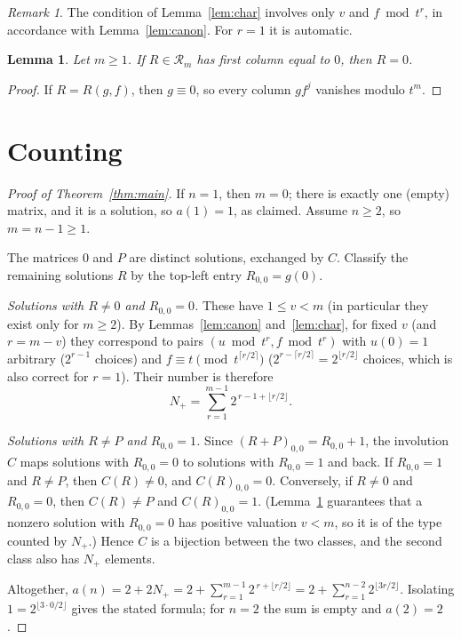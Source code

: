 \documentclass[11pt,a4paper]{amsart}
\newtheorem{lemma}[theorem]{Lemma}
\theoremstyle{definition}
\theoremstyle{remark}
\newtheorem{remark}[theorem]{Remark}
\newcommand{\Rm}{\mathcal{R}_m}
\begin{document}
\begin{remark}
The condition of Lemma~\ref{lem:char} involves only $v$ and $f\bmod t^{r}$, in accordance with Lemma~\ref{lem:canon}. For $r=1$ it is automatic.
\end{remark}

\begin{lemma}\label{lem:zero}
Let $m\ge1$. If $R\in\Rm$ has first column equal to $0$, then $R=0$.
\end{lemma}

\begin{proof}
If $R=R(g,f)$, then $g\equiv0$, so every column $gf^j$ vanishes modulo $t^m$.
\end{proof}

\section{Counting}\label{sec:count}

\begin{proof}[Proof of Theorem~\ref{thm:main}]
If $n=1$, then $m=0$; there is exactly one (empty) matrix, and it is a solution, so $a(1)=1$, as claimed. Assume $n\ge2$, so $m=n-1\ge1$.

The matrices $0$ and $P$ are distinct solutions, exchanged by $C$. Classify the remaining solutions $R$ by the top-left entry $R_{0,0}=g(0)$.

\emph{Solutions with $R\ne0$ and $R_{0,0}=0$.} These have $1\le v<m$ (in particular they exist only for $m\ge2$). By Lemmas~\ref{lem:canon} and~\ref{lem:char}, for fixed $v$ (and $r=m-v$) they correspond to pairs $(u\bmod t^r, f\bmod t^r)$ with $u(0)=1$ arbitrary ($2^{r-1}$ choices) and $f\equiv t\pmod{t^{\lceil r/2\rceil}}$ ($2^{r-\lceil r/2\rceil}=2^{\lfloor r/2\rfloor}$ choices, which is also correct for $r=1$). Their number is therefore
\[
  N_+=\sum_{r=1}^{m-1}2^{\,r-1+\lfloor r/2\rfloor}.
\]

\emph{Solutions with $R\ne P$ and $R_{0,0}=1$.} Since $(R+P)_{0,0}=R_{0,0}+1$, the involution $C$ maps solutions with $R_{0,0}=0$ to solutions with $R_{0,0}=1$ and back. If $R_{0,0}=1$ and $R\neq P$, then $C(R)\neq 0$, and $C(R)_{0,0}=0$. Conversely, if $R\ne 0$ and $R_{0,0}=0$, then $C(R)\neq P$ and $C(R)_{0,0}=1$. (Lemma~\ref{lem:zero} guarantees that a nonzero solution with $R_{0,0}=0$ has positive valuation $v<m$, so it is of the type counted by $N_+$.) Hence $C$ is a bijection between the two classes, and the second class also has $N_+$ elements.

Altogether, $a(n)=2+2N_+=2+\sum_{r=1}^{m-1}2^{\,r+\lfloor r/2\rfloor}=2+\sum_{r=1}^{n-2}2^{\lfloor 3r/2\rfloor}$. Isolating $1=2^{\lfloor 3\cdot0/2\rfloor}$ gives the stated formula; for $n=2$ the sum is empty and $a(2)=2$.
\end{proof}
\end{document}

